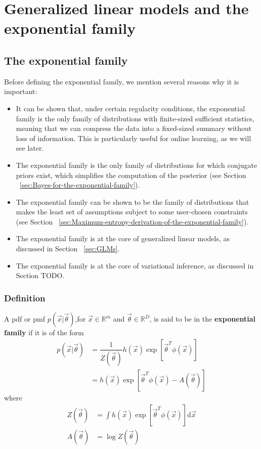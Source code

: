 \chapter{Generalized linear models and the exponential family}
\label{chap:GLM}


\section{The exponential family}
\label{sec:exponential-family}

Before defining the exponential family, we mention several reasons why it is important:
\begin{itemize}
\item{It can be shown that, under certain regularity conditions, the exponential family is the only family of distributions with finite-sized sufficient statistics, meaning that we can compress the data into a fixed-sized summary without loss of information. This is particularly useful for online learning, as we will see later.}
\item{The exponential family is the only family of distributions for which conjugate priors exist, which simplifies the computation of the posterior (see Section ~\ref{sec:Bayes-for-the-exponential-family}).}
\item{The exponential family can be shown to be the family of distributions that makes the least set of assumptions subject to some user-chosen constraints (see Section ~\ref{sec:Maximum-entropy-derivation-of-the-exponential-family}).}
\item{The exponential family is at the core of generalized linear models, as discussed in Section ~\ref{sec:GLMs}.}
\item{The exponential family is at the core of variational inference, as discussed in Section TODO.}
\end{itemize}


\subsection{Definition}
A pdf or pmf $p(\vec{x}|\vec{\theta})$,for $\vec{x} \in \mathbb{R}^m$ and $\vec{\theta} \in \mathbb{R}^D$, is said to be in the \textbf{exponential family} if it is of the form
\begin{align}
p(\vec{x}|\vec{\theta}) & =\dfrac{1}{Z(\vec{\theta})}h(\vec{x})\exp[\vec{\theta}^T\phi(\vec{x})] \\
    & = h(\vec{x})\exp[\vec{\theta}^T\phi(\vec{x})-A(\vec{\theta})] \label{eqn:exponential-family}
\end{align}
where
\begin{align}
Z(\vec{\theta}) & =\int h(\vec{x})\exp[\vec{\theta}^T\phi(\vec{x})]\mathrm{d}\vec{x} \\
A(\vec{\theta}) & =\log Z(\vec{\theta})
\end{align}

